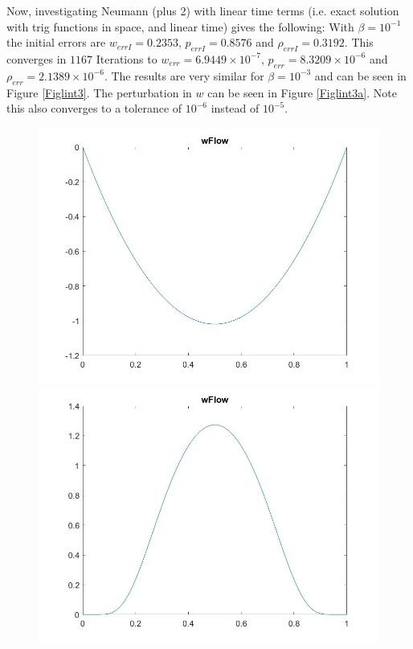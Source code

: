 \documentclass[11pt, a4paper]{article}
\theoremstyle{definition}
\begin{document}
Now, investigating Neumann (plus 2) with linear time terms (i.e. exact solution with trig functions in space, and linear time) gives the following: With $\beta=10^{-1}$ the initial errors are $w_{errI} = 0.2353$, $p_{errI} = 0.8576$ and $\rho_{errI}=0.3192$. This converges in $1167$ Iterations to $w_{err}=6.9449 \times 10^{-7}$, $p_{err}= 8.3209 \times 10^{-6}$ and $\rho_{err}= 2.1389 \times 10^{-6}$. The results are very similar for $\beta=10^{-3}$ and can be seen in Figure \ref{Figlint3}. The perturbation in $w$ can be seen in Figure \ref{Figlint3a}. Note this also converges to  a tolerance of $10^{-6}$ instead of $10^{-5}$.\\
\begin{figure}[h]
	\includegraphics[scale=0.3]{linNwexact1.jpg}
	\includegraphics[scale=0.3]{linNwerr1.jpg}

\end{figure}
\end{document}
